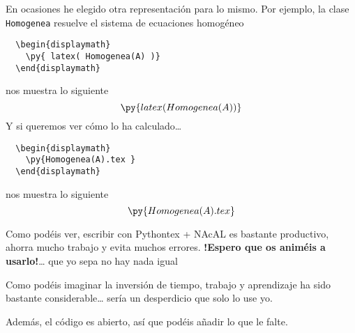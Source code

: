 \documentclass[12pt,a4paper]{article} %
\begin{document}
En ocasiones he elegido otra representación para lo mismo. Por
ejemplo, la clase \texttt{Homogenea} resuelve el sistema de ecuaciones
homogéneo
\begin{Verbatim}
  \begin{displaymath}
    \py{ latex( Homogenea(A) )}
  \end{displaymath}
\end{Verbatim}
nos muestra lo siguiente
\begin{displaymath}
  \py{latex( Homogenea(A) )}
\end{displaymath}
Y si queremos ver cómo lo ha calculado\dots
\begin{Verbatim}
  \begin{displaymath}
    \py{Homogenea(A).tex }
  \end{displaymath}
\end{Verbatim}
nos muestra lo siguiente
\begin{displaymath}
  \py{Homogenea(A).tex }
\end{displaymath}
\bigskip

Como podéis ver, escribir con Pythontex + NAcAL es bastante
productivo, ahorra mucho trabajo y evita muchos
errores. \textbf{!Espero que os animéis a usarlo!}\dots{} que yo sepa
no hay nada igual

Como podéis imaginar la inversión de tiempo, trabajo y aprendizaje ha
sido bastante considerable\dots{} sería un desperdicio que solo lo use
yo.  \bigskip

Además, el código es abierto, así que podéis añadir lo que le falte.
\end{document}
